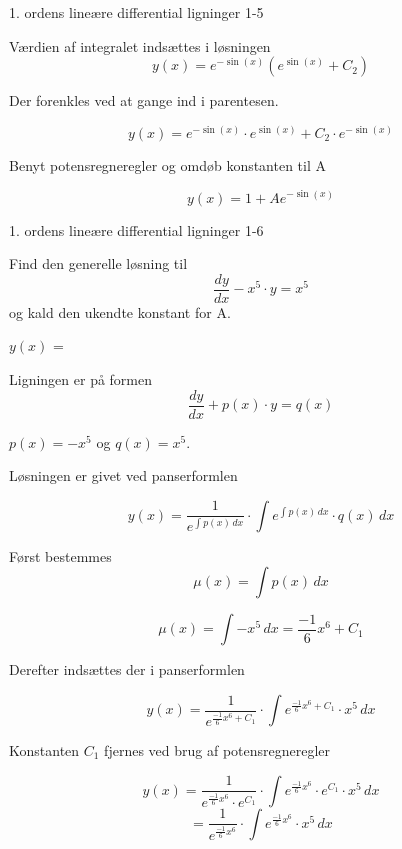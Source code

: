 \documentclass{article}
\begin{document}
\begin{exercise}{1. ordens lineære differential ligninger 1-5}
	\hint
	
	Værdien af integralet indsættes i løsningen
	\[
	y(x) = e^{- \sin(x)} \left( e^{\sin(x)}+ C_2\right)
	\]
	
	\hint
	
	Der forenkles ved at gange ind i parentesen.
	
	\hint
	\[
	y(x) = e^{- \sin(x)} \cdot e^{\sin(x)} + C_2 \cdot e^{- \sin(x)} 
	\]
	
	\hint
	
	Benyt potensregneregler og omdøb konstanten til A
	
	\hint
	\[
	y(x) = 1 + A e^{-\sin(x)}
	\]
	
	
\end{exercise}

\newpage

\begin{exercise}{1. ordens lineære differential ligninger 1-6}
	
	
	Find den generelle løsning til
	\[
	\frac{dy}{dx} - x^5 \cdot y = x^5
	\]
	og kald den ukendte konstant for A.
	
	$y(x)$ =   
	
	
	
	\hint
	
	Ligningen er på formen
	\[
	\frac{dy}{dx} + p(x) \cdot y = q(x)
	\]
	
	\hint
	
	$p(x)=-x^5$ og $q(x)=x^5$.
	
	\hint
	
	Løsningen er givet ved panserformlen
	
	
	\hint
	
	\[
	y(x) = \frac{1}{e^{\int p(x) \, dx}} \cdot \int e^{\int p(x) \, dx}  \cdot q(x) \, dx
	\]
	
	\hint
	
	Først bestemmes 
	\[
	\mu(x) = \int p(x) \, dx
	\]
	
	\hint
	\[
	\mu(x) = \int -x^5 \, dx = \frac{-1}{6} x^6 + C_1
	\]
	
	\hint
	Derefter indsættes der i  panserformlen
	
	\hint
	
	\[
	y(x) = \frac{1}{e^{\frac{-1}{6}x^6 + C_1}} \cdot \int e^{\frac{-1}{6}x^6 + C_1}  \cdot x^5 \, dx
	\]
	
	
	\hint
	
	Konstanten $C_1$ fjernes ved brug af potensregneregler
	
	\hint
	\[
	y(x) = \frac{1}{e^{\frac{-1}{6}x^6} \cdot e^{C_1}} \cdot \int e^{\frac{-1}{6}x^6} \cdot e^{C_1}  \cdot x^5 \, dx 
	\]
	\[
	= \frac{1}{e^{\frac{-1}{6}x^6}} \cdot \int e^{\frac{-1}{6}x^6}  \cdot x^5 \, dx
	\]
	

\end{exercise}
\end{document}
